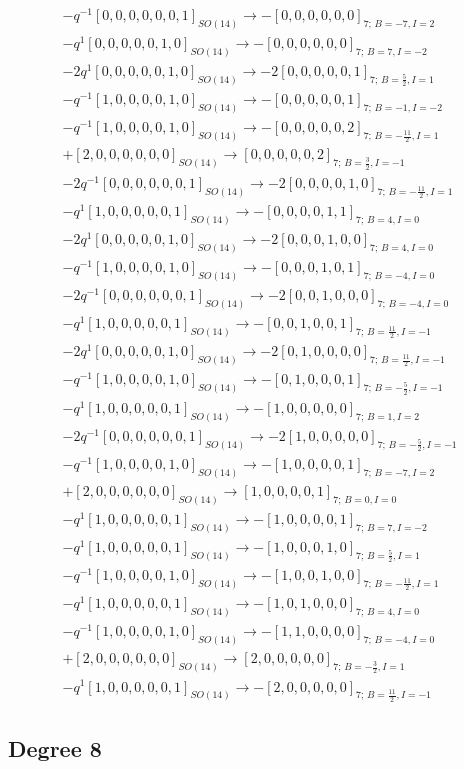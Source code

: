 \documentclass{article}
\begin{document}
\[\begin{gathered} -q^{-1}[0,0,0,0,0,0,1]_{SO(14)}\longrightarrow -[0,0,0,0,0,0]_{7;\,B=-7,I=2}\\-q^{1}[0,0,0,0,0,1,0]_{SO(14)}\longrightarrow -[0,0,0,0,0,0]_{7;\,B=7,I=-2}\\-2q^{1}[0,0,0,0,0,1,0]_{SO(14)}\longrightarrow -2[0,0,0,0,0,1]_{7;\,B=\frac{5}{2},I=1}\\-q^{-1}[1,0,0,0,0,1,0]_{SO(14)}\longrightarrow -[0,0,0,0,0,1]_{7;\,B=-1,I=-2}\\-q^{-1}[1,0,0,0,0,1,0]_{SO(14)}\longrightarrow -[0,0,0,0,0,2]_{7;\,B=-\frac{11}{2},I=1}\\+[2,0,0,0,0,0,0]_{SO(14)}\longrightarrow [0,0,0,0,0,2]_{7;\,B=\frac{3}{2},I=-1}\\-2q^{-1}[0,0,0,0,0,0,1]_{SO(14)}\longrightarrow -2[0,0,0,0,1,0]_{7;\,B=-\frac{11}{2},I=1}\\-q^{1}[1,0,0,0,0,0,1]_{SO(14)}\longrightarrow -[0,0,0,0,1,1]_{7;\,B=4,I=0}\\-2q^{1}[0,0,0,0,0,1,0]_{SO(14)}\longrightarrow -2[0,0,0,1,0,0]_{7;\,B=4,I=0}\\-q^{-1}[1,0,0,0,0,1,0]_{SO(14)}\longrightarrow -[0,0,0,1,0,1]_{7;\,B=-4,I=0}\\-2q^{-1}[0,0,0,0,0,0,1]_{SO(14)}\longrightarrow -2[0,0,1,0,0,0]_{7;\,B=-4,I=0}\\-q^{1}[1,0,0,0,0,0,1]_{SO(14)}\longrightarrow -[0,0,1,0,0,1]_{7;\,B=\frac{11}{2},I=-1}\\-2q^{1}[0,0,0,0,0,1,0]_{SO(14)}\longrightarrow -2[0,1,0,0,0,0]_{7;\,B=\frac{11}{2},I=-1}\\-q^{-1}[1,0,0,0,0,1,0]_{SO(14)}\longrightarrow -[0,1,0,0,0,1]_{7;\,B=-\frac{5}{2},I=-1}\\-q^{1}[1,0,0,0,0,0,1]_{SO(14)}\longrightarrow -[1,0,0,0,0,0]_{7;\,B=1,I=2}\\-2q^{-1}[0,0,0,0,0,0,1]_{SO(14)}\longrightarrow -2[1,0,0,0,0,0]_{7;\,B=-\frac{5}{2},I=-1}\\-q^{-1}[1,0,0,0,0,1,0]_{SO(14)}\longrightarrow -[1,0,0,0,0,1]_{7;\,B=-7,I=2}\\+[2,0,0,0,0,0,0]_{SO(14)}\longrightarrow [1,0,0,0,0,1]_{7;\,B=0,I=0}\\-q^{1}[1,0,0,0,0,0,1]_{SO(14)}\longrightarrow -[1,0,0,0,0,1]_{7;\,B=7,I=-2}\\-q^{1}[1,0,0,0,0,0,1]_{SO(14)}\longrightarrow -[1,0,0,0,1,0]_{7;\,B=\frac{5}{2},I=1}\\-q^{-1}[1,0,0,0,0,1,0]_{SO(14)}\longrightarrow -[1,0,0,1,0,0]_{7;\,B=-\frac{11}{2},I=1}\\-q^{1}[1,0,0,0,0,0,1]_{SO(14)}\longrightarrow -[1,0,1,0,0,0]_{7;\,B=4,I=0}\\-q^{-1}[1,0,0,0,0,1,0]_{SO(14)}\longrightarrow -[1,1,0,0,0,0]_{7;\,B=-4,I=0}\\+[2,0,0,0,0,0,0]_{SO(14)}\longrightarrow [2,0,0,0,0,0]_{7;\,B=-\frac{3}{2},I=1}\\-q^{1}[1,0,0,0,0,0,1]_{SO(14)}\longrightarrow -[2,0,0,0,0,0]_{7;\,B=\frac{11}{2},I=-1}\end{gathered}\]\subsection*{Degree 8}
\end{document}
